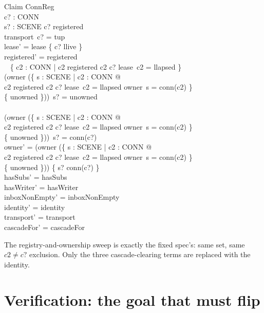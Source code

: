 \documentclass[a4paper,10pt,fleqn]{article}
\begin{document}
\begin{schema}{Claim}
  \Delta ConnReg \\
  c? : CONN \\
  s? : SCENE
\where
  c? \in registered \\
  transport~c? = tup \\
  lease' = lease \oplus \{ c? \mapsto llive \} \\
  registered' = registered \setminus \\
  \quad~ \{ c2 : CONN | c2 \in registered \land c2 \neq c? \land
    lease~c2 = llapsed \} \\
  (owner \oplus (\{ s : SCENE | \exists c2 : CONN @ \\
    \qquad c2 \in registered \land c2 \neq c? \land lease~c2 = llapsed
    \land owner~s = conn(c2) \} \\
    \qquad \cross \{ unowned \}))~s? = unowned \\
  \lor \\
  (owner \oplus (\{ s : SCENE | \exists c2 : CONN @ \\
    \qquad c2 \in registered \land c2 \neq c? \land lease~c2 = llapsed
    \land owner~s = conn(c2) \} \\
    \qquad \cross \{ unowned \}))~s? = conn(c?) \\
  owner' = (owner \oplus (\{ s : SCENE | \exists c2 : CONN @ \\
    \qquad c2 \in registered \land c2 \neq c? \land lease~c2 = llapsed
    \land owner~s = conn(c2) \} \\
    \qquad \cross \{ unowned \})) \oplus \{ s? \mapsto conn(c?) \} \\
  hasSubs' = hasSubs \\
  hasWriter' = hasWriter \\
  inboxNonEmpty' = inboxNonEmpty \\
  identity' = identity \\
  transport' = transport \\
  cascadeFor' = cascadeFor
\end{schema}

The registry-and-ownership sweep is exactly the fixed spec's: same set,
same \(c2 \neq c?\) exclusion. Only the three cascade-clearing terms are
replaced with the identity.

\section{Verification: the goal that must flip}
\end{document}
